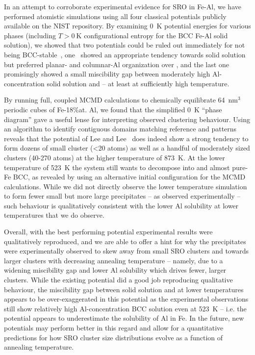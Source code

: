 In an attempt to corroborate experimental evidence for SRO in Fe-Al, we have performed atomistic simulations using all four classical potentials publicly available on the NIST repository.
By examining 0~K potential energies for various phases (including $T>0~\mathrm{K}$ configurational entropy for the BCC Fe-Al solid solution), we showed that two potentials could be ruled out immediately for not being BCC-stable~\cite{farkas2020model, jelinek2012modified}, one~\cite{mendelev2005effect} showed an appropriate tendency towards solid solution but preferred planar- and columnar-Al organization over \DOTHREE, and the last one~\cite{lee2010modified} promisingly showed a small miscibility gap between moderately high Al-concentration solid solution and \DOTHREE -- at least at sufficiently high temperature.

By running full, coupled MCMD calculations to chemically equilibrate 64~$\mathrm{nm}^3$ periodic cubes of Fe-18\%at. Al, we found that the simplified 0~K ``phase diagram'' gave a useful lense for interpreting observed clustering behaviour.
Using an algorithm to identify contiguous domains matching reference \DOTHREE and \BTWO patterns reveals that the potential of Lee and Lee~\cite{lee2010modified} does indeed show a strong tendency to form dozens of small cluster (<20 atoms) as well as a handful of moderately sized clusters (40-270 atoms) at the higher temperature of 873~K.
At the lower temperature of 523~K the system still wants to decompose into \DOTHREE and almost pure-Fe BCC, as revealed by using an alternative initial configuration for the MCMD calculations.
While we did not directly observe the lower temperature simulation to form fewer small but more large precipitates -- as observed experimentally -- such behaviour is qualitatively consistent with the lower Al solubility at lower temperatures that we do observe.

Overall, with the best performing potential experimental results were qualitatively reproduced, and we are able to offer a hint for why the \DOTHREE precipitates were experimentally observed to skew away from small SRO clusters and towards larger clusters with decreasing annealing temperature -- namely, due to a widening miscibility gap and lower Al solubility which drives fewer, larger clusters.
While the existing potential did a good job reproducing qualitative behaviour, the miscibility gap between solid solution and \DOTHREE at lower temperatures appears to be over-exaggerated in this potential as the experimental observations still show relatively high Al-concentration BCC solution even at 523~K -- i.e. the potential appears to underestimate the solubility of Al in Fe.
In the future, new potentials may perform better in this regard and allow for a quantitative predictions for how SRO cluster size distributions evolve as a function of annealing temperature.

